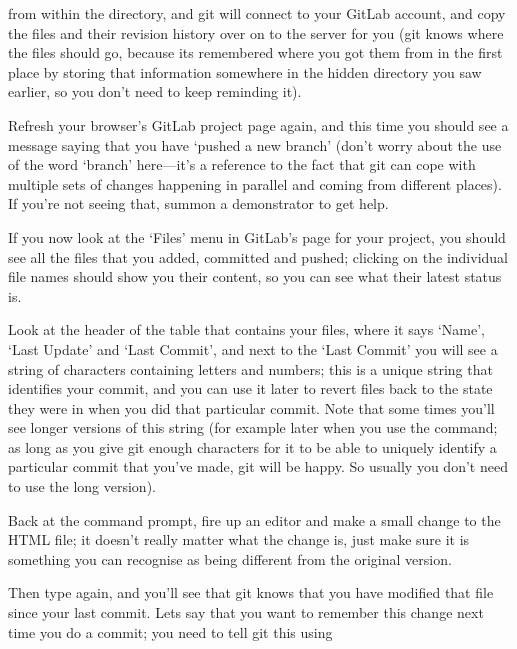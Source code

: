 from within the  directory, and git will connect to your GitLab account, and copy the files and their revision history over on to the server for you (git knows where the files should go, because its remembered where you got them from in the first place by storing that information somewhere in the hidden  directory you saw earlier, so you don't need to keep reminding it). 

Refresh your browser's GitLab project page again, and this time you should see a message saying that you have `pushed a new branch' (don't worry about the use of the word `branch' here---it's a reference to the fact that git can cope with multiple sets of changes happening in parallel and coming from different places). If you're not seeing that, summon a demonstrator to get help. 

If you now look at the `Files' menu in GitLab's page for your  project, you should see all the files that you added, committed and pushed; clicking on the individual file names should show you their content, so you can see what their latest status is. 

Look at the header of the table that contains your files, where it says `Name', `Last Update' and `Last Commit', and next to the `Last Commit' you will see a string of characters containing letters and numbers; this is a unique string that identifies your commit, and you can use it later to revert files back to the state they were in when you did that particular commit. Note that some times you'll see longer versions of this string (for example later when you use the  command; as long as you give git enough characters for it to be able to uniquely identify a particular commit that you've made, git will be happy. So usually you don't need to use the long version).

Back at the command prompt, fire up an editor and make a small change to the HTML file; it doesn't really matter what the change is, just make sure it is something you can recognise as being different from the original version.

Then type  again, and you'll see that git knows that you have modified that file since your last commit. Lets say that you want to remember this change next time you do a commit; you need to tell git this using 


